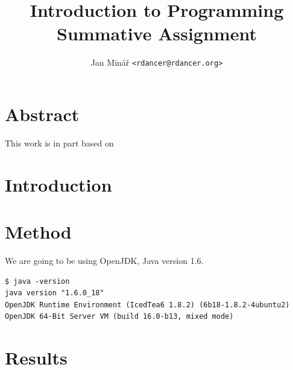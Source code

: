 \documentclass[10pt]{report}
\author{Jan Minář {\tt <rdancer@rdancer.org>}}
\title{Introduction to Programming\\Summative Assignment}
\begin{document}


\maketitle



\chapter{Abstract}
\thispagestyle{fancy}
This work is in part based on \cite{minar}

\chapter{Introduction}
\thispagestyle{fancy}

\chapter{Method}
\thispagestyle{fancy}

We are going to be using OpenJDK, Java version 1.6.
\begin{verbatim}
$ java -version
java version "1.6.0_18"
OpenJDK Runtime Environment (IcedTea6 1.8.2) (6b18-1.8.2-4ubuntu2)
OpenJDK 64-Bit Server VM (build 16.0-b13, mixed mode)
\end{verbatim}

\chapter{Results}
\thispagestyle{fancy}
\end{document}
